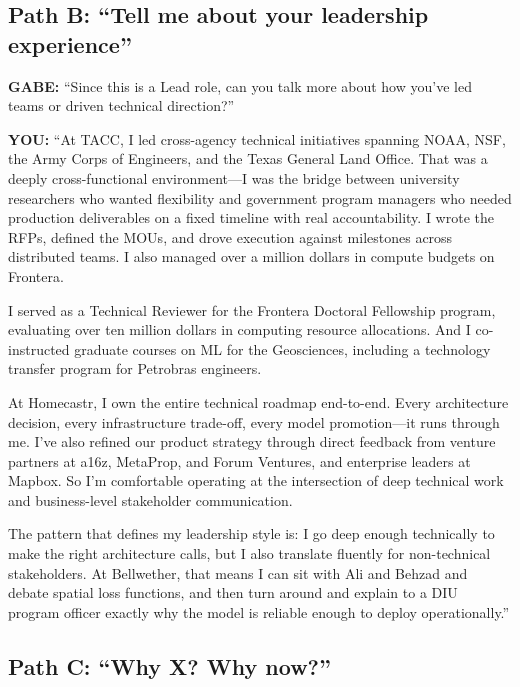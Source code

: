 \documentclass[11pt,letterpaper]{article}
\newenvironment{gabe}{\begin{mdframed}[backgroundcolor=gabebg,linewidth=0pt,innertopmargin=8pt,innerbottommargin=8pt]\textbf{\color{xred}GABE:} }{\end{mdframed}}
\newenvironment{you}{\begin{mdframed}[backgroundcolor=youbg,linewidth=0pt,innertopmargin=8pt,innerbottommargin=8pt]\textbf{\color{xblue}YOU:} }{\end{mdframed}}
\begin{document}
\subsection*{Path B: ``Tell me about your leadership experience''}

\begin{gabe}
``Since this is a Lead role, can you talk more about how you've led teams or driven technical direction?''
\end{gabe}

\begin{you}
``At TACC, I led cross-agency technical initiatives spanning NOAA, NSF, the Army Corps of Engineers, and the Texas General Land Office. That was a deeply cross-functional environment---I was the bridge between university researchers who wanted flexibility and government program managers who needed production deliverables on a fixed timeline with real accountability. I wrote the RFPs, defined the MOUs, and drove execution against milestones across distributed teams. I also managed over a million dollars in compute budgets on Frontera.

I served as a Technical Reviewer for the Frontera Doctoral Fellowship program, evaluating over ten million dollars in computing resource allocations. And I co-instructed graduate courses on ML for the Geosciences, including a technology transfer program for Petrobras engineers.

At Homecastr, I own the entire technical roadmap end-to-end. Every architecture decision, every infrastructure trade-off, every model promotion---it runs through me. I've also refined our product strategy through direct feedback from venture partners at a16z, MetaProp, and Forum Ventures, and enterprise leaders at Mapbox. So I'm comfortable operating at the intersection of deep technical work and business-level stakeholder communication.

The pattern that defines my leadership style is: I go deep enough technically to make the right architecture calls, but I also translate fluently for non-technical stakeholders. At Bellwether, that means I can sit with Ali and Behzad and debate spatial loss functions, and then turn around and explain to a DIU program officer exactly why the model is reliable enough to deploy operationally.''
\end{you}

\subsection*{Path C: ``Why X? Why now?''}
\end{document}
